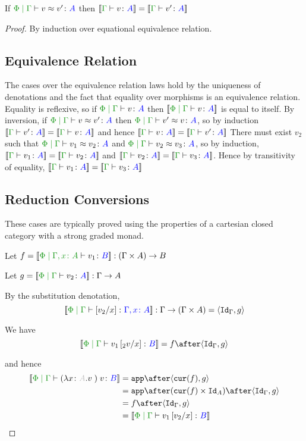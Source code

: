 \documentclass{report}
\begin{document}
\begin{theorem}[Soundness]
    If $\eberelation{\P}{\G}{v}{v'}{A}$ then $\gdenoequality{v}{v'}{A}$
\end{theorem}

\begin{framed}
    \begin{proof}
        By induction over equational equivalence relation.
        \subsection{Equivalence Relation}
        The cases over the equivalence relation laws hold by the uniqueness of denotations and the fact that equality over morphisms is an equivalence relation.
        Equality is reflexive, so if $\gpetyperelation{v}{A}$ then $\deno{\gpetyperelation{v}{A}}$ is equal to itself.
        By inversion, if $\gpeberelation{v}{v'}{A}$ then $\gpeberelation{v'}{v}{A}$, so by induction $\gdenoequality{v'}{v}{A}$ and hence $\gdenoequality{v}{v'}{A}$
        There must exist $v_2$ such that $\gpeberelation{v_1}{v_2}{A}$ and $\gpeberelation{v_2}{v_3}{A}$, so by induction,
        $\gdenoequality{v_1}{v_2}{A}$ and $\gdenoequality{v_2}{v_3}{A}$. Hence by transitivity of equality, $\gdenoequality{v_1}{v_3}{A}$
        
        \subsection{Reduction Conversions}
        These cases are typically proved using the properties of a cartesian closed category with a strong graded monad.
        
            Let $f = \deno{\etyperelation{\P}{\gax}{v_1}{B}}: (\G \times A) \rightarrow B$
        
            Let $g = \deno{\gpetyperelation{v_2}{A}}: \G \rightarrow A$
        
            By the substitution denotation, $$\deno{\etyperelation{\P}{\G}{\ssub{x}{v_2}}{\gax}}: \G \rightarrow (\G \times A) = \pr{\idg}{g}$$
        
            We have $$\deno{\gpetyperelation{v_1\ssub{x}{_2v}}{B}} = f \after \pr{\idg}{g}$$
        
            and hence
            \begin{equation}
                \begin{split}
                    \deno{\gpetyperelation{\apply{(\lam{x}{A}{v})}{v}}{B}} & = \app\after\pr{\cur{f}}{g} \\
                    & = \app\after(\cur{f}\times\Id{A})\after\pr{\idg}{g}\\
                    & = f \after \pr{\idg}{g} \\
                    & = \deno{\gpetyperelation{v_1\ssub{x}{v_2}}{B}}  
                \end{split}
            \end{equation}
           

\end{proof}
\end{framed}
\end{document}
